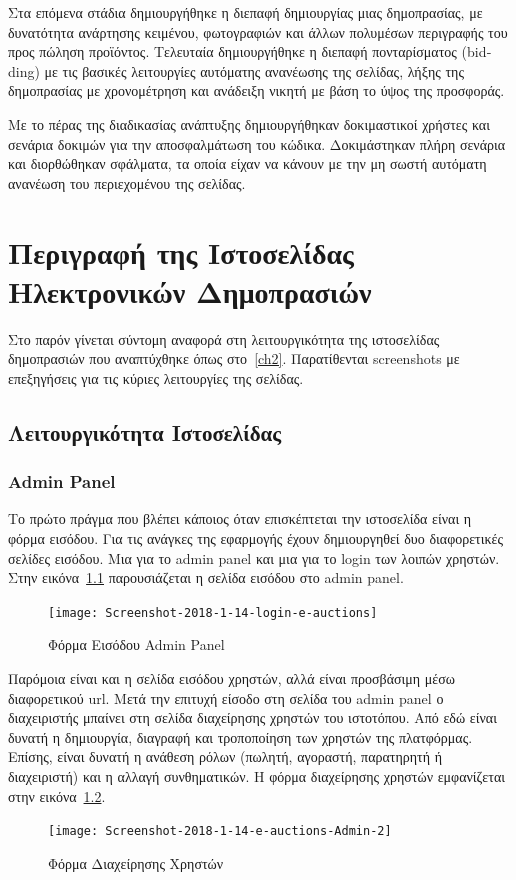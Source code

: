 \documentclass[12pt]{report}
\begin{document}
Στα επόμενα στάδια δημιουργήθηκε η διεπαφή δημιουργίας μιας δημοπρασίας, με δυνατότητα ανάρτησης κειμένου, φωτογραφιών και άλλων πολυμέσων περιγραφής του προς πώληση προϊόντος. Τελευταία δημιουργήθηκε η διεπαφή πονταρίσματος (\textlatin{bidding}) με τις βασικές λειτουργίες αυτόματης ανανέωσης της σελίδας, λήξης της δημοπρασίας με χρονομέτρηση και ανάδειξη νικητή με βάση το ύψος της προσφοράς.

Με το πέρας της διαδικασίας ανάπτυξης δημιουργήθηκαν δοκιμαστικοί χρήστες και σενάρια δοκιμών για την αποσφαλμάτωση του κώδικα. Δοκιμάστηκαν πλήρη σενάρια και διορθώθηκαν σφάλματα, τα οποία είχαν να κάνουν με την μη σωστή αυτόματη ανανέωση του περιεχομένου της σελίδας.

\chapter{Περιγραφή της Ιστοσελίδας Ηλεκτρονικών Δημοπρασιών}\label{ch3}
Στο παρόν γίνεται σύντομη αναφορά στη λειτουργικότητα της ιστοσελίδας δημοπρασιών που αναπτύχθηκε όπως στο~\ref{ch2}. Παρατίθενται \textlatin{screenshots} με επεξηγήσεις για τις κύριες λειτουργίες της σελίδας.

\section{Λειτουργικότητα Ιστοσελίδας}
\subsection{\textlatin{Admin Panel}}
Το πρώτο πράγμα που βλέπει κάποιος όταν επισκέπτεται την ιστοσελίδα είναι η φόρμα εισόδου. Για τις ανάγκες της εφαρμογής έχουν δημιουργηθεί δυο διαφορετικές σελίδες εισόδου. Μια για το \textlatin{admin panel} και μια για το \textlatin{login} των λοιπών χρηστών. Στην εικόνα~\ref{fig:login_1} παρουσιάζεται η σελίδα εισόδου στο \textlatin{admin panel}.
\begin{figure}[H]
\centering
\texttt{[image: Screenshot-2018-1-14-login-e-auctions]}
\caption{Φόρμα Εισόδου \textlatin{Admin Panel}}
\label{fig:login_1}
\end{figure}

Παρόμοια είναι και η σελίδα εισόδου χρηστών, αλλά είναι προσβάσιμη μέσω διαφορετικού \textlatin{url}. Μετά την επιτυχή είσοδο στη σελίδα του \textlatin{admin panel} ο διαχειριστής μπαίνει στη σελίδα διαχείρησης χρηστών του ιστοτόπου. Από εδώ είναι δυνατή η δημιουργία, διαγραφή και τροποποίηση των χρηστών της πλατφόρμας. Επίσης, είναι δυνατή η ανάθεση ρόλων (πωλητή, αγοραστή, παρατηρητή ή διαχειριστή) και η αλλαγή συνθηματικών. Η φόρμα διαχείρησης χρηστών εμφανίζεται στην εικόνα~\ref{fig:user_admin}.
\begin{figure}[H]
\centering
\texttt{[image: Screenshot-2018-1-14-e-auctions-Admin-2]}
\caption{Φόρμα Διαχείρησης Χρηστών}
\label{fig:user_admin}
\end{figure}
\end{document}
